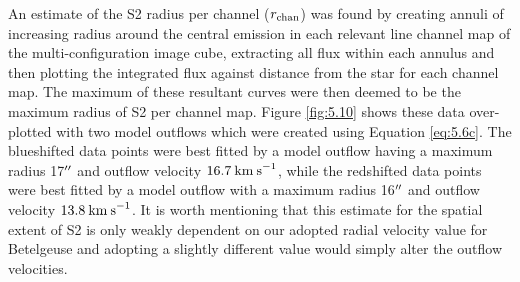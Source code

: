 An estimate of the S2 radius per channel ($r_{\rm{chan}}$) was found by creating annuli of increasing radius around the central emission in each relevant line channel map of the multi-configuration image cube, extracting all flux within each annulus and then plotting the integrated flux against distance from the star for each channel map. The maximum of these resultant curves were then deemed to be the maximum radius of S2 per channel map. Figure \ref{fig:5.10} shows these data over-plotted with two model outflows which were created using Equation \ref{eq:5.6c}. The blueshifted data points were best fitted by a model outflow having a maximum radius 17$^{\prime\prime}$ and outflow velocity $16.7\>{\rm km\>s}^{-1}$, while the redshifted data points were best fitted by a model outflow with a maximum radius 16$^{\prime\prime}$ and outflow velocity $13.8\>{\rm km\>s}^{-1}$. It is worth mentioning that this estimate for the spatial extent of S2 is only weakly dependent on our adopted radial velocity value for Betelgeuse and adopting a slightly different value would simply alter the outflow velocities.

